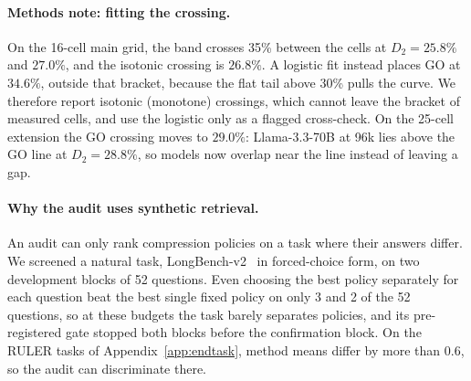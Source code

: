 \begin{table}[h]
\centering
\small
\caption{Predictor comparison on the 25 regime-map cells (\S\ref{sec:regimes}).  Columns: pooled Spearman correlation with $\gplus$; the same partialled on model identity; leave-one-model-out error of a log-linear fit of $\gplus$, as a multiplicative factor; mean Spearman within the held-out model.  All predictors are cell medians of per-head medians on the rows that define $D_2$; the recomputed $D_2$ matches the reported one to within 0.52 points in every cell.  The heterogeneity statistic is the spread of $\tfrac12\log_2 w_i$; for log-normal $w$ it ranks cells as the AM/GM ratio does.}
\label{tab:app-predictors}

\end{table}

\paragraph{Methods note: fitting the crossing.}
On the 16-cell main grid, the band crosses
35\% between the cells at $D_2=25.8\%$ and $27.0\%$, and the isotonic crossing is
$26.8\%$.  A logistic fit instead places GO at $34.6\%$, outside that bracket,
because the flat tail above 30\% pulls the curve.  We therefore report isotonic
(monotone) crossings, which cannot leave the bracket of measured cells, and use
the logistic only as a flagged cross-check.  On the 25-cell extension the GO
crossing moves to $29.0\%$: Llama-3.3-70B at 96k lies above the GO line at
$D_2=28.8\%$, so models now overlap near the line instead of leaving a gap.

\paragraph{Why the audit uses synthetic retrieval.}
An audit can only rank compression policies on a task where their answers
differ.  We screened a natural task, LongBench-v2~\citep{bai2025longbenchv2} in
forced-choice form, on two development blocks of 52 questions.  Even choosing
the best policy separately for each question beat the best single fixed policy
on only 3 and 2 of the 52 questions, so at these budgets the task barely
separates policies, and its pre-registered gate stopped both blocks before the
confirmation block.  On the RULER tasks of Appendix~\ref{app:endtask}, method
means differ by more than 0.6, so the audit can discriminate there.


